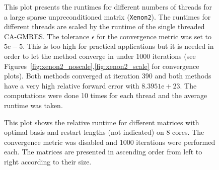 \documentclass{scrartcl}
\numberwithin{equation}{section}
\begin{document}
\begin{figure}[H]
	\centering
	\resizebox{1.0\textwidth}{!}{}
	\caption{This plot presents the runtimes for different numbers of threads for a large sparse unpreconditioned matrix (\texttt{Xenon2}). The runtimes for different threads are scaled by the runtime of the single threaded CA-GMRES. The tolerance $\epsilon$ for the convergence metric was set to $5\text{e}-5$. This is too high for practical applications but it is needed in order to let the method converge in under 1000 iterations (see Figures~\ref{fig:xenon2_noscale},\ref{fig:xenon2_scale} for convergence plots). Both methods converged at iteration 390 and both methods have a very high relative forward error with $ 8.3951\text{e}+23$. The computations were done 10 times for each thread and the average runtime was taken.}
	\label{fig:runtimes_threads_xenon2}
\end{figure}
\begin{figure}[H]
	\centering
	\resizebox{1.0\textwidth}{!}{}
	\caption{This plot shows the relative runtime for different matrices with optimal basis and restart lengths (not indicated) on 8 cores. The convergence metric was disabled and 1000 iterations were performed each. The matrices are presented in ascending order from left to right according to their size.}
	\label{fig:runtimes_matrices}
\end{figure}
\end{document}
